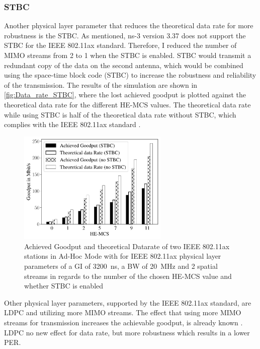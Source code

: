 \subsubsection*{\acf{STBC}}
\label{sec:STBCDataRate}
Another physical layer parameter that reduces the theoretical data rate for more robustness is the \ac{STBC}.
As mentioned, ns-3 version 3.37 does not support the \ac{STBC} for the IEEE 802.11ax standard.
Therefore, I reduced the number of
\ac{MIMO} streams from \num{2} to \num{1} when the \ac{STBC} is enabled. \ac{STBC} would transmit a redundant copy of the data on the second antenna, which would be combined
using the space-time block code (STBC) to increase the robustness and reliability of the transmission.
The results of the simulation are shown in \autoref{fig:Data_rate_STBC}, where the lost achieved goodput is plotted against
the theoretical data rate for the different \ac{HE}-\ac{MCS} values.
The theoretical data rate while using \ac{STBC} is half of the theoretical data rate without \ac{STBC},
which complies with the IEEE 802.11ax standard \cite{ieee_standard_2021ax}.
\begin{figure}[H]%
   \centering
   \includegraphics[width=0.64\textwidth]{figures/STBC_dataRate_simulation}
   \caption{Achieved Goodput and theoretical Datarate of two IEEE 802.11ax stations in Ad-Hoc Mode with for IEEE 802.11ax physical layer parameters of a \acf{GI} of \SI{3200}{\nano\second}, a \acf{BW} of \SI{20}{\mega\hertz} and 2 spatial streams  in regards to the number of the chosen \ac{HE}-\acf{MCS} value and whether \acf{STBC} is enabled}%
   \label{fig:Data_rate_STBC}%
\end{figure}

Other physical layer parameters, supported by the IEEE 802.11ax standard, are \ac{LDPC} and utilizing more \ac{MIMO} streams.
The effect that using more \ac{MIMO} streams for transmission increases the achievable goodput, is already known \cite{sauter_wireless_2022, ieee_standard_2021ax, ieee_standard_2020}.
\ac{LDPC} no new effect for data rate, but more robustness which results in a lower \ac{PER}.

